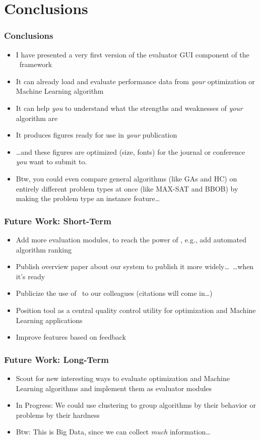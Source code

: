 %
\section{Conclusions}%
%
\begin{frame}%
\frametitle{Conclusions}%
\begin{itemize}%
\item I have presented a very first version of the evaluator GUI component of the \optimizationBenchmarking\ framework%
\item<2-> It can already load and evaluate performance data from \emph{your} optimization or Machine Learning algorithm%
\item<3-> It can help \emph{you} to understand what the strengths and weaknesses of \emph{your} algorithm are%
\item<4-> It produces figures ready for use in \emph{your} publication%
\item<5-> {\dots}and these figures are optimized (size, fonts) for the journal or conference \emph{you} want to submit to.%
\item<6-> Btw, you could even compare general algorithms (like GAs and HC) on entirely different problem types at once (like MAX-SAT and BBOB) by making the problem type an instance feature\dots%
\end{itemize}%
\end{frame}
%
%
\begin{frame}%
\frametitle{Future Work: Short-Term}%
\begin{itemize}%
\item Add more evaluation modules, to reach the power of \tspSuite\expandafter\scitep{\tspSuiteReferences}, e.g., add automated algorithm ranking%
\item<2-> Publish overview paper about our system to publish it more widely\dots\ {\dots}when it's ready%
\item<3-> Publicize the use of \optimizationBenchmarking\ to our colleagues (citations will come in\dots)%
\item<4-> Position tool as a central quality control utility for optimization and Machine Learning applications%
\item<5-> Improve features based on feedback%
\end{itemize}%
\end{frame}
%
\begin{frame}%
\frametitle{Future Work: Long-Term}%
\begin{itemize}%
\item Scout for new interesting ways to evaluate optimization and Machine Learning algorithms and implement them as evaluator modules%
\item<2-> In Progress: We could use clustering to group algorithms by their behavior or problems by their hardness%
\item<3-> Btw: This is Big Data, since we can collect \emph{much} information\dots%
\end{itemize}%
\end{frame}%
%